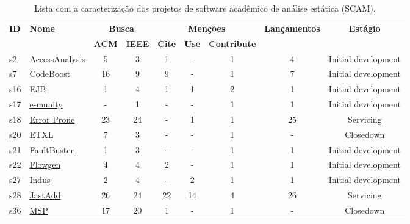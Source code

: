 \begin{table*}[htb]
\caption{Lista com a caracterização dos projetos de software acadêmico de análise estática (SCAM).}
\centering
\begin{tabular}{| l l | c c | c c c | c | c |}
\hline
  \multirow{2}{*}{\textbf{ID}} & \multirow{2}{*}{\textbf{Nome}} & \multicolumn{2}{|c|}{\textbf{Busca}} & \multicolumn{3}{|c|}{\textbf{Menções}}           & \multirow{2}{*}{\textbf{Lançamentos}} & \multirow{2}{*}{\textbf{Estágio}} \\
                               &                                & \textbf{ACM} & \textbf{IEEE}       & \textbf{Cite} & \textbf{Use} & \textbf{Contribute} &                                       &                                   \\
  \hline
s2 &
  \href{http://accessanalysis.sourceforge.net}{AccessAnalysis} &
  5 &
  3 &
  1 &
  - &
  1 &
  4 &
  Initial development \\
s7 &
  \href{http://codeboost.org}{CodeBoost} &
  16 &
  9 &
  9 &
  - &
  1 &
  7 &
  Initial development \\
s16 &
  \href{https://www.dropbox.com/s/glhg8any43lccgm/EJB.zip}{EJB} &
  1 &
  4 &
  1 &
  1 &
  2 &
  1 &
  Initial development \\
s17 &
  \href{http://sourceforge.net/p/emunity/code/ci/master/tree/}{e-munity} &
  - &
  1 &
  - &
  - &
  1 &
  1 &
  Initial development \\
s18 &
  \href{http://code.google.com/p/error-prone}{Error Prone} &
  23 &
  24 &
  - &
  1 &
  1 &
  25 &
  Servicing \\
s20 &
  \href{http://www.cs.queensu.ca/home/thurston/etxl}{ETXL} &
  7 &
  3 &
  - &
  - &
  1 &
  - &
  Closedown \\
s21 &
  \href{http://www.sed.inf.u-szeged.hu/FaultBuster}{FaultBuster} &
  1 &
  3 &
  - &
  - &
  1 &
  1 &
  Initial development \\
s22 &
  \href{https://github.com/jlopezvi/Flowgen}{Flowgen} &
  4 &
  4 &
  2 &
  - &
  1 &
  1 &
  Initial development \\
s27 &
  \href{http://indus.projects.cis.ksu.edu}{Indus} &
  2 &
  4 &
  - &
  2 &
  1 &
  1 &
  Initial development \\
s28 &
  \href{http://jastadd.cs.lth.se/web}{JastAdd} &
  26 &
  24 &
  22 &
  14 &
  4 &
  26 &
  Servicing \\
s36 &
  \href{http://icps.u-strasbg.fr/software/msp}{MSP} &
  17 &
  20 &
  1 &
  - &
  1 &
  - &
  Closedown \\

\end{tabular}
\end{table*}
